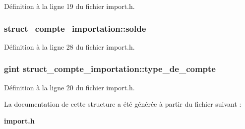 Définition à la ligne 19 du fichier import.h.

\subsubsection[{solde}]{ {\bf struct\_\-compte\_\-importation::solde}}\label{structstruct__compte__importation_a9c9132279c2dac0301bc5061088d3596}


Définition à la ligne 28 du fichier import.h.

\subsubsection[{type\_\-de\_\-compte}]{\setlength{\rightskip}{0pt plus 5cm}gint {\bf struct\_\-compte\_\-importation::type\_\-de\_\-compte}}\label{structstruct__compte__importation_a36a0a4246c032137dfe0f526cc98e21a}


Définition à la ligne 20 du fichier import.h.



La documentation de cette structure a été générée à partir du fichier suivant :\begin{DoxyCompactItemize}
\item 
{\bf import.h}\end{DoxyCompactItemize}
